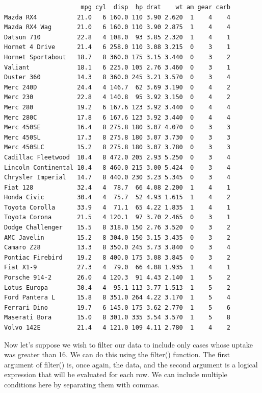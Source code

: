 \documentclass[
]{article}
\begin{document}
\begin{verbatim}
                     mpg cyl  disp  hp drat    wt am gear carb
Mazda RX4           21.0   6 160.0 110 3.90 2.620  1    4    4
Mazda RX4 Wag       21.0   6 160.0 110 3.90 2.875  1    4    4
Datsun 710          22.8   4 108.0  93 3.85 2.320  1    4    1
Hornet 4 Drive      21.4   6 258.0 110 3.08 3.215  0    3    1
Hornet Sportabout   18.7   8 360.0 175 3.15 3.440  0    3    2
Valiant             18.1   6 225.0 105 2.76 3.460  0    3    1
Duster 360          14.3   8 360.0 245 3.21 3.570  0    3    4
Merc 240D           24.4   4 146.7  62 3.69 3.190  0    4    2
Merc 230            22.8   4 140.8  95 3.92 3.150  0    4    2
Merc 280            19.2   6 167.6 123 3.92 3.440  0    4    4
Merc 280C           17.8   6 167.6 123 3.92 3.440  0    4    4
Merc 450SE          16.4   8 275.8 180 3.07 4.070  0    3    3
Merc 450SL          17.3   8 275.8 180 3.07 3.730  0    3    3
Merc 450SLC         15.2   8 275.8 180 3.07 3.780  0    3    3
Cadillac Fleetwood  10.4   8 472.0 205 2.93 5.250  0    3    4
Lincoln Continental 10.4   8 460.0 215 3.00 5.424  0    3    4
Chrysler Imperial   14.7   8 440.0 230 3.23 5.345  0    3    4
Fiat 128            32.4   4  78.7  66 4.08 2.200  1    4    1
Honda Civic         30.4   4  75.7  52 4.93 1.615  1    4    2
Toyota Corolla      33.9   4  71.1  65 4.22 1.835  1    4    1
Toyota Corona       21.5   4 120.1  97 3.70 2.465  0    3    1
Dodge Challenger    15.5   8 318.0 150 2.76 3.520  0    3    2
AMC Javelin         15.2   8 304.0 150 3.15 3.435  0    3    2
Camaro Z28          13.3   8 350.0 245 3.73 3.840  0    3    4
Pontiac Firebird    19.2   8 400.0 175 3.08 3.845  0    3    2
Fiat X1-9           27.3   4  79.0  66 4.08 1.935  1    4    1
Porsche 914-2       26.0   4 120.3  91 4.43 2.140  1    5    2
Lotus Europa        30.4   4  95.1 113 3.77 1.513  1    5    2
Ford Pantera L      15.8   8 351.0 264 4.22 3.170  1    5    4
Ferrari Dino        19.7   6 145.0 175 3.62 2.770  1    5    6
Maserati Bora       15.0   8 301.0 335 3.54 3.570  1    5    8
Volvo 142E          21.4   4 121.0 109 4.11 2.780  1    4    2
\end{verbatim}

Now let's suppose we wish to filter our data to include only cases whose
uptake was greater than 16. We can do this using the filter() function.
The first argument of filter() is, once again, the data, and the second
argument is a logical expression that will be evaluated for each row. We
can include multiple conditions here by separating them with commas.
\end{document}
